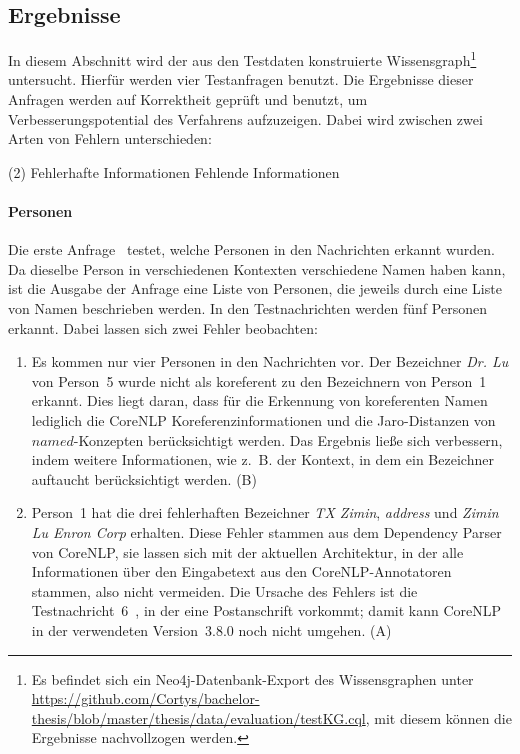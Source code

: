 \subsection{Ergebnisse}%
\label{sec:evaluation:quality:results}

In diesem Abschnitt wird der aus den Testdaten konstruierte Wissensgraph\footnote{Es befindet sich ein Neo4j-Datenbank-Export des Wissensgraphen unter \url{https://github.com/Cortys/bachelor-thesis/blob/master/thesis/data/evaluation/testKG.cql}, mit diesem können die Ergebnisse nachvollzogen werden.} untersucht.
Hierfür werden vier Testanfragen benutzt.
Die Ergebnisse dieser Anfragen werden auf Korrektheit geprüft und benutzt, um Verbesserungspotential des Verfahrens aufzuzeigen.
Dabei wird zwischen zwei Arten von Fehlern unterschieden:
\newcommand{\errorA}{{\color{rot} (A)}}
\newcommand{\errorB}{{\color{blau} (B)}}
\begin{tasks}[label-offset=1em](2) %
	\task[\errorA] \color{rot}Fehlerhafte Informationen
	\task[\errorB] \color{blau}Fehlende Informationen
\end{tasks}

\paragraph{Personen}
Die erste Anfrage~ testet, welche Personen in den Nachrichten erkannt wurden.
Da dieselbe Person in verschiedenen Kontexten verschiedene Namen haben kann, ist die Ausgabe der Anfrage eine Liste von Personen, die jeweils durch eine Liste von Namen beschrieben werden.
In den Testnachrichten werden fünf Personen erkannt.
Dabei lassen sich zwei Fehler beobachten:
\begin{enumerate}
	\item Es kommen nur vier Personen in den Nachrichten vor.
		Der Bezeichner \textit{Dr. Lu} von Person~5 wurde nicht als koreferent zu den Bezeichnern von Person~1 erkannt. %
		Dies liegt daran, dass für die Erkennung von koreferenten Namen lediglich die CoreNLP Koreferenzinformationen und die Jaro-Distanzen von $named$-Konzepten berücksichtigt werden.
		Das Ergebnis ließe sich verbessern, indem weitere Informationen, wie z.~B. der Kontext, in dem ein Bezeichner auftaucht berücksichtigt werden. \errorB\
	\item Person~1 hat die drei fehlerhaften Bezeichner \textit{TX Zimin}, \textit{address} und \textit{Zimin Lu Enron Corp} erhalten.
		Diese Fehler stammen aus dem Dependency Parser von CoreNLP, sie lassen sich mit der aktuellen Architektur, in der alle Informationen über den Eingabetext aus den CoreNLP-Annotatoren stammen, also nicht vermeiden.
		Die Ursache des Fehlers ist die Testnachricht~6~\tref{sec:appendix:msgs}, in der eine Postanschrift vorkommt;
		damit kann CoreNLP in der verwendeten Version~3.8.0 noch nicht umgehen. \errorA\
\end{enumerate}


